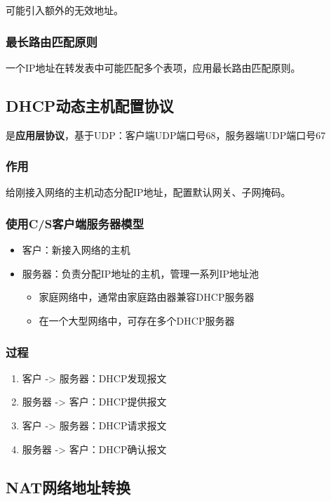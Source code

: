 可能引入额外的无效地址。

\subsubsection{最长路由匹配原则}
一个IP地址在转发表中可能匹配多个表项，应用最长路由匹配原则。


\subsection{DHCP动态主机配置协议}
是\textbf{应用层协议}，基于UDP：客户端UDP端口号68，服务器端UDP端口号67

\subsubsection{作用}
给刚接入网络的主机动态分配IP地址，配置默认网关、子网掩码。


\subsubsection{使用C/S客户端服务器模型}
\begin{itemize}
    \item 客户：新接入网络的主机
    \item 服务器：负责分配IP地址的主机，管理一系列IP地址池\begin{itemize}
        \item 家庭网络中，通常由家庭路由器兼容DHCP服务器
        \item 在一个大型网络中，可存在多个DHCP服务器
    \end{itemize}
\end{itemize}


\subsubsection{过程}
\begin{enumerate}
    \item 客户 -> 服务器：DHCP发现报文
    \item 服务器 -> 客户：DHCP提供报文
    \item 客户 -> 服务器：DHCP请求报文
    \item 服务器 -> 客户：DHCP确认报文
\end{enumerate}


\subsection{NAT网络地址转换}

